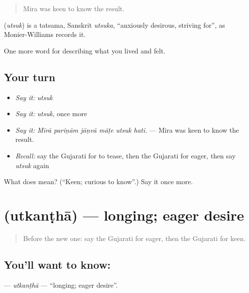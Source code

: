 \begin{quote}
Mira was keen to know the result.
\end{quote}

\begin{cousinweb}
\textbf{} (\emph{utsuk}) is a tatsama, Sanskrit \emph{utsuka}, \textquotedblleft{}anxiously desirous, striving for\textquotedblright{}, as Monier-Williams records it.
\end{cousinweb}

\begin{grammarlens}[title={What you've built}]
One more word for describing what you lived and felt.
\end{grammarlens}

\subsection*{Your turn}
\begin{itemize}
\raggedright
  \item \emph{Say it:} \emph{utsuk}
  \item \emph{Say it:} \emph{utsuk}, once more
  \item \emph{Say it:} \emph{Mīrā pariṇām jāṇvā māṭe utsuk hatī.} — Mira was keen to know the result.
  \item \emph{Recall:} say the Gujarati for to tease, then the Gujarati for eager, then say \emph{utsuk} again
\end{itemize}

\begin{tcolorbox}[breakable,colback=teal!4,colframe=teal!35!black,title={Before you move on}]
What does  mean? (\textquotedblleft{}Keen; curious to know\textquotedblright{}.) Say it once more.
\end{tcolorbox}
\section[\texorpdfstring{\gu{ઉત્કંઠા} (utkanṭhā)}{ઉત્કંઠા (utkanṭhā)}]{ (utkanṭhā) — longing; eager desire}

\label{lesson:GU-C449-utkantha}



\begin{quote}
Before the new one: say the Gujarati for eager, then the Gujarati for keen.
\end{quote}

\subsection*{You'll want to know: }
\textbf{} — \emph{utkanṭhā} — \textquotedblleft{}longing; eager desire\textquotedblright{}.

